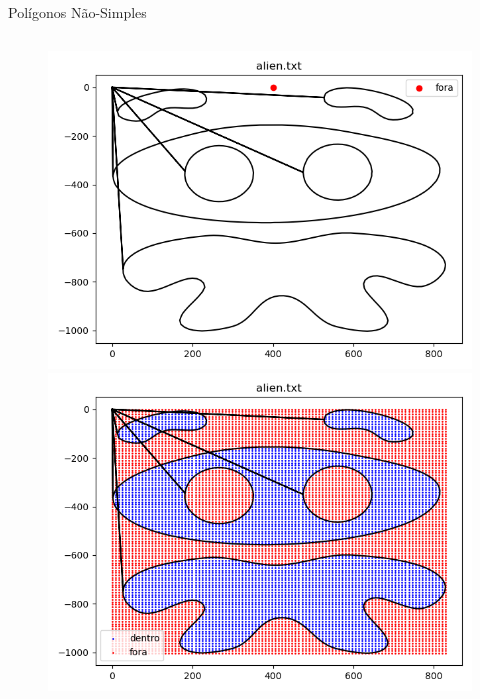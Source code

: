 \documentclass[aspectratio=169,usenames,dvipsnames]{beamer}
\begin{document}
\begin{frame}{Polígonos Não-Simples}
  
  \begin{columns}
    \begin{center}
      \begin{figure}
        \begin{overprint}
        \includegraphics[width=1.0\textwidth]{figures/alien.png}
        \includegraphics[width=1.0\textwidth]{figures/alien_grid.png}
        \end{overprint}
      \end{figure}
    \end{center}

\end{columns}
\end{frame}
\end{document}
